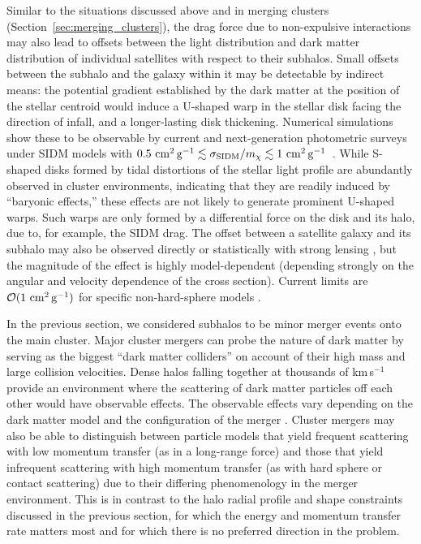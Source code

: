 Similar to the situations discussed above and in merging clusters (Section~\ref{sec:merging_clusters}), the drag force due to non-expulsive interactions may also lead to offsets between the light distribution and dark matter distribution of individual satellites with respect to their subhalos. Small offsets between the subhalo and the galaxy within it may be detectable by indirect means: the potential gradient established by the dark matter at the position of the stellar centroid would induce a U-shaped warp in the stellar disk facing the direction of infall, and a longer-lasting disk thickening. Numerical simulations show these to be observable by current and next-generation photometric surveys under SIDM models with $0.5 \mathrm{\,\mathrm{\,cm}^2\mathrm{\,g}^{-1}} \lesssim \sigma_{\rm SIDM}/m_\chi \lesssim 1 \mathrm{\,\mathrm{\,cm}^2\mathrm{\,g}^{-1}}$~\citep{Secco}. While S-shaped disks formed by tidal distortions of the stellar light profile are abundantly observed in cluster environments, indicating that they are readily induced by ``baryonic effects,'' these effects are not likely to generate prominent U-shaped warps. Such warps are only formed by a differential force on the disk and its halo, due to, for example, the SIDM drag.  The offset between a satellite galaxy and its subhalo may also be observed directly or statistically with strong lensing \citep{Massey2011,Massey:2017cwf}, but the magnitude of the effect is highly model-dependent (depending strongly on the angular and velocity dependence of the cross section).  Current limits are $\mathcal{O}(1\mathrm{\,\mathrm{\,cm}^2\mathrm{\,g}^{-1}})$ for specific non-hard-sphere models \citep{Harvey:2015hha}.  

\vspace{1em} 
\label{sec:merging_clusters}

In the previous section, we considered subhalos to be minor merger events onto the main cluster.  Major cluster mergers can probe the nature of dark matter by serving as the biggest ``dark matter colliders'' on account of their high mass and large collision velocities. Dense halos falling together at thousands of km\,s$^{-1}$ provide an environment where the scattering of dark matter particles off each other would have observable effects.  The observable effects vary depending on the dark matter model and the configuration of the merger \citep{Kim:2016ujt}. 
Cluster mergers may also be able to distinguish between particle models that yield frequent scattering with low momentum transfer (as in a long-range force) and those that yield infrequent scattering with high momentum transfer (as with hard sphere or contact scattering) due to their differing phenomenology in the merger environment.  This is in contrast to the halo radial profile and shape constraints discussed in the previous section, for which the energy and momentum transfer rate matters most and for which there is no preferred direction in the problem.

